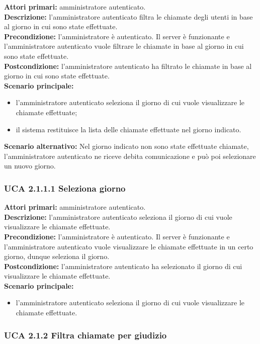 \noindent
\textbf{Attori primari:} amministratore autenticato.\\
\textbf{Descrizione:} l'amministratore autenticato filtra le chiamate degli utenti in base al giorno in cui sono state effettuate.\\
\textbf{Precondizione:} l'amministratore è autenticato. Il server è funzionante e l'amministratore autenticato vuole filtrare le chiamate in base al giorno in cui sono state effettuate.\\
\textbf{Postcondizione:} l'amministratore autenticato ha filtrato le chiamate in base al giorno in cui sono state effettuate.\\
\textbf{Scenario principale:}
\begin{itemize}
\item l'amministratore autenticato seleziona il giorno di cui vuole visualizzare le chiamate effettuate;
\item il sistema restituisce la lista delle chiamate effettuate nel giorno indicato.
\end{itemize}
\textbf{Scenario alternativo:} Nel giorno indicato non sono state effettuate chiamate, l'amministratore autenticato ne riceve debita comunicazione e può poi selezionare un nuovo giorno.\\

\subsubsection{UCA 2.1.1.1 Seleziona giorno}
\noindent
\textbf{Attori primari:} amministratore autenticato.\\
\textbf{Descrizione:} l'amministratore autenticato seleziona il giorno di cui vuole visualizzare le chiamate effettuate.\\
\textbf{Precondizione:} l'amministratore è autenticato. Il server è funzionante e l'amministratore autenticato vuole visualizzare le chiamate effettuate in un certo giorno, dunque seleziona il giorno.\\
\textbf{Postcondizione:} l'amministratore autenticato ha selezionato il giorno di cui visualizzare le chiamate effettuate.\\
\textbf{Scenario principale:}
\begin{itemize}
\item l'amministratore autenticato seleziona il giorno di cui vuole visualizzare le chiamate effettuate.
\end{itemize}

\subsubsection{UCA 2.1.2 Filtra chiamate per giudizio}

